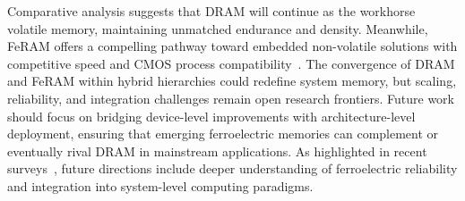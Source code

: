 Comparative analysis suggests that DRAM will continue as the workhorse volatile memory, maintaining unmatched endurance and density. 
Meanwhile, FeRAM offers a compelling pathway toward embedded non-volatile solutions with competitive speed and CMOS process compatibility~\cite{noheda2023, martin2020}. 
The convergence of DRAM and FeRAM within hybrid hierarchies could redefine system memory, but scaling, reliability, and integration challenges remain open research frontiers. 
Future work should focus on bridging device-level improvements with architecture-level deployment, ensuring that emerging ferroelectric memories can complement or eventually rival DRAM in mainstream applications.
As highlighted in recent surveys~\cite{noheda2023, martin2020}, 
future directions include deeper understanding of ferroelectric reliability 
and integration into system-level computing paradigms.
